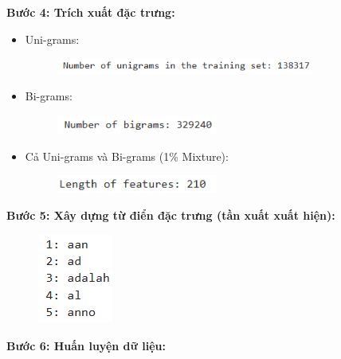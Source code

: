 \textbf{Bước 4: Trích xuất đặc trưng:}
\begin{itemize}
    \item Uni-grams: 
    \begin{figure}[H]
    \centering
    \includegraphics[width=0.8\textwidth]{img/docspics/Picture28.png}
\end{figure}
    \item Bi-grams:
    \begin{figure}[H]
    \centering
    \includegraphics[width=0.5\textwidth]{img/docspics/Picture29.png}
\end{figure}
    \item Cả Uni-grams và Bi-grams (1\% Mixture):
    \begin{figure}[H]
    \centering
    \includegraphics[width=0.5\textwidth]{img/docspics/Picture30.png}
\end{figure}
    \end{itemize}
    
\textbf{Bước 5: Xây dựng từ điển đặc trưng (tần xuất xuất hiện):}
\begin{figure}[H]
    \centering
    \includegraphics[width=0.2 \textwidth]{img/docspics/Picture31.png}
\end{figure}
\clearpage
\textbf{Bước 6: Huấn luyện dữ liệu:}

